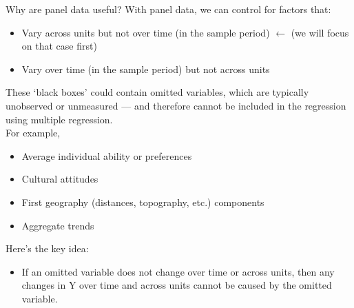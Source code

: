 \documentclass[notes,10pt, aspectratio=169]{beamer}
\begin{document}

\begin{frame}{Why are panel data useful? }
With panel data, we can control for factors that:
\begin{itemize}
    \item Vary across units but not over time (in the sample period) {\footnotesize $\longleftarrow$ (we will focus on that case first)}
    \item Vary over time (in the sample period) but not across units
\end{itemize}
\vspace{1em}
These `black boxes' could contain omitted variables, which are typically unobserved or unmeasured --- and therefore cannot be included in the regression using multiple regression.\\[1em]

For example,
\begin{itemize}
    \item Average individual ability or preferences
    \item Cultural attitudes
    \item First geography (distances, topography, etc.) components
    \item Aggregate trends
\end{itemize}
\vspace{1em}

Here’s the key idea:\\
\begin{itemize}
    \item If an omitted variable does not change over time or across units, then any changes in Y over time and across units cannot be caused by the omitted variable.
\end{itemize}
\end{frame}
\end{document}
